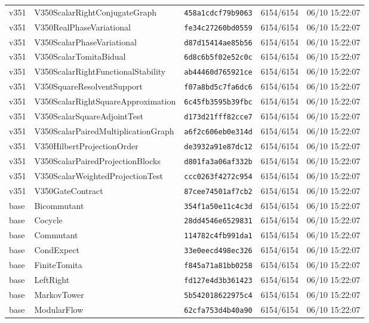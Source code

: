 \documentclass[11pt]{article}
\theoremstyle{definition}\newtheorem{deriv}{Derivation}
\begin{document}
{\begin{longtable}{@{}lllll@{}}
v351 & V350ScalarRightConjugateGraph & \texttt{458a1cdcf79b9063} & 6154/6154 & 06/10 15:22:07 \\
v351 & V350RealPhaseVariational & \texttt{fe34c27260bd0559} & 6154/6154 & 06/10 15:22:07 \\
v351 & V350ScalarPhaseVariational & \texttt{d87d15414ae85b56} & 6154/6154 & 06/10 15:22:07 \\
v351 & V350ScalarTomitaBidual & \texttt{6d8c6b5f02e52c0c} & 6154/6154 & 06/10 15:22:07 \\
v351 & V350ScalarRightFunctionalStability & \texttt{ab44460d765921ce} & 6154/6154 & 06/10 15:22:07 \\
v351 & V350SquareResolventSupport & \texttt{f07a8bd5c7fa6dc6} & 6154/6154 & 06/10 15:22:07 \\
v351 & V350ScalarRightSquareApproximation & \texttt{6c45fb3595b39fbc} & 6154/6154 & 06/10 15:22:07 \\
v351 & V350ScalarSquareAdjointTest & \texttt{d173d21fff82cce7} & 6154/6154 & 06/10 15:22:07 \\
v351 & V350ScalarPairedMultiplicationGraph & \texttt{a6f2c606eb0e314d} & 6154/6154 & 06/10 15:22:07 \\
v351 & V350HilbertProjectionOrder & \texttt{de3932a91e87dc12} & 6154/6154 & 06/10 15:22:07 \\
v351 & V350ScalarPairedProjectionBlocks & \texttt{d801fa3a06af332b} & 6154/6154 & 06/10 15:22:07 \\
v351 & V350ScalarWeightedProjectionTest & \texttt{ccc0263f4272c954} & 6154/6154 & 06/10 15:22:07 \\
v351 & V350GateContract & \texttt{87cee74501af7cb2} & 6154/6154 & 06/10 15:22:07 \\
base & Bicommutant & \texttt{354f1a50e11c4c3d} & 6154/6154 & 06/10 15:22:07 \\
base & Cocycle & \texttt{28dd4546e6529831} & 6154/6154 & 06/10 15:22:07 \\
base & Commutant & \texttt{114782c4fb991da1} & 6154/6154 & 06/10 15:22:07 \\
base & CondExpect & \texttt{33e0eecd498ec326} & 6154/6154 & 06/10 15:22:07 \\
base & FiniteTomita & \texttt{f845a71a81bb0258} & 6154/6154 & 06/10 15:22:07 \\
base & LeftRight & \texttt{fd127e4d3b361423} & 6154/6154 & 06/10 15:22:07 \\
base & MarkovTower & \texttt{5b542018622975c4} & 6154/6154 & 06/10 15:22:07 \\
base & ModularFlow & \texttt{62cfa753d4b40a90} & 6154/6154 & 06/10 15:22:07 \\

\end{longtable}}
\end{document}
